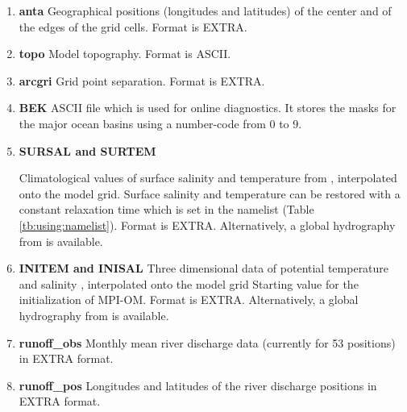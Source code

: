 \begin{enumerate}


\item \textbf{anta} \newline 
Geographical positions (longitudes and latitudes) of the center and of the edges
of the grid cells. Format is EXTRA.
 
\item \textbf{topo} \newline 
Model topography. Format is ASCII.



\item \textbf{arcgri} \newline
Grid point separation. Format is EXTRA.

\item \textbf{BEK} \newline
ASCII file which is used for online diagnostics. It stores
the masks for the major ocean basins using a number-code from 0 to 9.

\item \textbf{SURSAL and SURTEM} \newline 

Climatological values of surface salinity and temperature from \citet{Steele:2001}, interpolated onto the model grid. 
Surface salinity and temperature can be restored with a constant relaxation time 
which is set in the namelist (Table \ref{tb:using:namelist}). Format is EXTRA.
Alternatively, a global hydrography from \citet{Gouretski:2004} is available.

\item \textbf{INITEM and INISAL} 
Three dimensional data of potential temperature and salinity \citep{Steele:2001}, interpolated onto the model grid
Starting value for the initialization of MPI-OM. Format is EXTRA.
Alternatively, a global hydrography from \citet{Gouretski:2004} is available.


\item \textbf{runoff\_obs} \newline
 Monthly mean river discharge data (currently for 53 positions) in EXTRA format.

\item \textbf{runoff\_pos} \newline
 Longitudes and latitudes of the river discharge positions in EXTRA format.

\end{enumerate}

